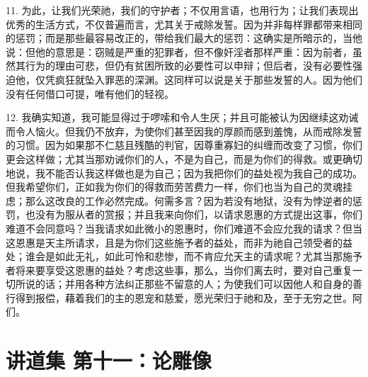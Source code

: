 11. 为此，让我们光荣祂，我们的守护者；不仅用言语，也用行为；让我们表现出优秀的生活方式，不仅普遍而言，尤其关于戒除发誓。因为并非每样罪都带来相同的惩罚；而是那些最容易改正的，带给我们最大的惩罚：这确实是所暗示的，当他说：但他的意思是：窃贼是严重的犯罪者，但不像奸淫者那样严重：因为前者，虽然其行为的理由可悲，但仍有贫困所致的必要性可以申辩；但后者，没有必要性强迫他，仅凭疯狂就坠入罪恶的深渊。这同样可以说是关于那些发誓的人。因为他们没有任何借口可提，唯有他们的轻视。\par

12. 我确实知道，我可能显得过于啰嗦和令人生厌；并且可能被认为因继续这劝诫而令人恼火。但我仍不放弃，为使你们甚至因我的厚颜而感到羞愧，从而戒除发誓的习惯。因为如果那不仁慈且残酷的判官，因尊重寡妇的纠缠而改变了习惯，你们更会这样做；尤其当那劝诫你们的人，不是为自己，而是为你们的得救。或更确切地说，我不能否认我这样做也是为自己；因为我把你们的益处视为我自己的成功。但我希望你们，正如我为你们的得救而劳苦费力一样，你们也当为自己的灵魂挂虑；那么这改良的工作必然完成。何需多言？因为若没有地狱，没有为悖逆者的惩罚，也没有为服从者的赏报；并且我来向你们，以请求恩惠的方式提出这事，你们难道不会同意吗？当我请求如此微小的恩惠时，你们难道不会应允我的请求？但当这恩惠是天主所请求，且是为你们这些施予者的益处，而非为祂自己领受者的益处；谁会是如此无礼，如此可怜和悲惨，而不肯应允天主的请求呢？尤其当那施予者将来要享受这恩惠的益处？考虑这些事，那么，当你们离去时，要对自己重复一切所说的话；并用各种方法纠正那些不留意的人；为使我们可以因他人和自身的善行得到报偿，藉着我们的主的恩宠和慈爱，愿光荣归于祂和及，至于无穷之世。阿们。\par



\section{讲道集 第十一：论雕像}

\par

